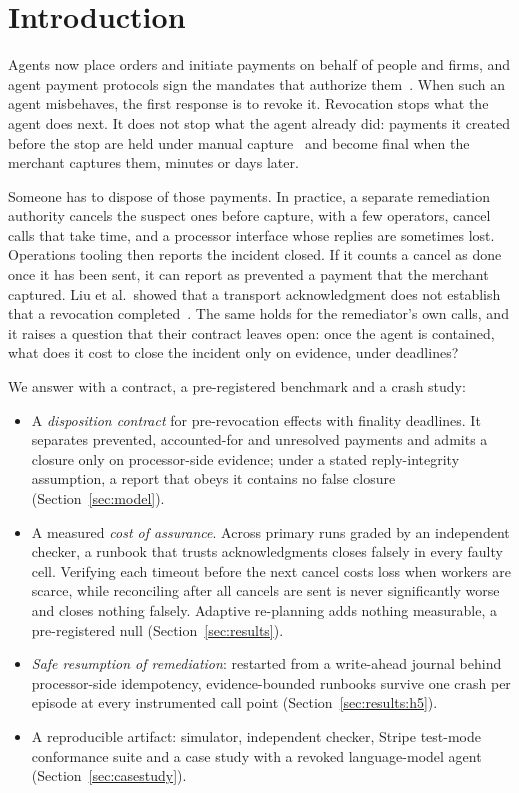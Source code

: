 \section{Introduction}\label{sec:intro}

Agents now place orders and initiate payments on behalf of people and firms, and agent payment protocols sign the mandates that authorize them~\cite{aviv2026ap2}. When such an agent misbehaves, the first response is to revoke it. Revocation stops what the agent does next. It does not stop what the agent already did: payments it created before the stop are held under manual capture~\cite{stripe2026hold} and become final when the merchant captures them, minutes or days later.

Someone has to dispose of those payments. In practice, a separate remediation authority cancels the suspect ones before capture, with a few operators, cancel calls that take time, and a processor interface whose replies are sometimes lost. Operations tooling then reports the incident closed. If it counts a cancel as done once it has been sent, it can report as prevented a payment that the merchant captured. Liu et al.\ showed that a transport acknowledgment does not establish that a revocation completed~\cite{liu2026revocation}. The same holds for the remediator's own calls, and it raises a question that their contract leaves open: once the agent is contained, what does it cost to close the incident only on evidence, under deadlines?

We answer with a contract, a pre-registered benchmark and a crash study:
\begin{itemize}
  \item A \emph{disposition contract} for pre-revocation effects with finality deadlines. It separates prevented, accounted-for and unresolved payments and admits a closure only on processor-side evidence; under a stated reply-integrity assumption, a report that obeys it contains no false closure (Section~\ref{sec:model}).
  \item A measured \emph{cost of assurance}. Across \NRunsPrimary{} primary runs graded by an independent checker, a runbook that trusts acknowledgments closes falsely in every faulty cell. Verifying each timeout before the next cancel costs loss when workers are scarce, while reconciling after all cancels are sent is never significantly worse and closes nothing falsely. Adaptive re-planning adds nothing measurable, a pre-registered null (Section~\ref{sec:results}).
  \item \emph{Safe resumption of remediation}: restarted from a write-ahead journal behind processor-side idempotency, evidence-bounded runbooks survive one crash per episode at every instrumented call point (Section~\ref{sec:results:h5}).
  \item A reproducible artifact: simulator, independent checker, Stripe test-mode conformance suite and a case study with a revoked language-model agent (Section~\ref{sec:casestudy}).
\end{itemize}

